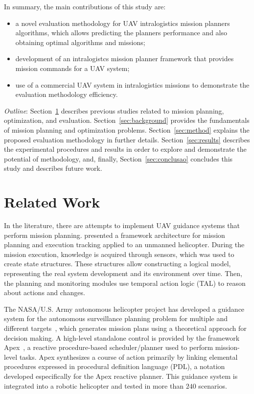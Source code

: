 \documentclass[conference,harvard,brazil,english]{sbatex}
\begin{document}
In summary, the main contributions of this study are:
\begin{itemize}
\item a novel evaluation methodology for UAV intralogistics mission planners algorithms, which allows predicting the planners performance and also obtaining optimal algorithms and missions;
\item development of an intralogistcs mission planner framework that provides mission commands for a UAV system; 
\item use of a commercial UAV system in intralogistics missions to demonstrate the evaluation methodology efficiency.
\end{itemize}

\textit{Outline}: Section~\ref{sec:related} describes previous studies related to mission planning, optimization, and evaluation. Section~\ref{sec:background} provides the fundamentals of mission planning and optimization problems. Section~\ref{sec:method} explains the proposed evaluation methodology in further details. Section~\ref{sec:results} describes the experimental procedures and results in order to explore and demonstrate the potential of methodology, and, finally, Section~\ref{sec:conclusao} concludes this study and describes future work.

\section{Related Work}
\label{sec:related}

In the literature, there are attempts to implement UAV guidance systems that perform mission planning.  presented a framework architecture for mission planning and execution tracking applied to an unmanned helicopter. During the mission execution, knowledge is acquired through sensors, which was used to create state structures. These structures allow constructing a logical model, representing the real system development and its environment over time. Then, the planning and monitoring modules use temporal action logic (TAL) to reason about actions and changes.

The NASA/U.S. Army autonomous helicopter project has developed a guidance system for the autonomous surveillance planning problem for multiple and different targets~\cite{whalley2005design}, which generates mission plans using a theoretical approach for decision making. A high-level standalone control is provided by the framework Apex~\cite{baer1998nasa}, a reactive procedure-based scheduler/planner used to perform mission-level tasks. Apex synthesizes a course of action primarily by linking elemental procedures expressed in procedural definition language (PDL), a notation developed especifically for the Apex reactive planner. This guidance system is integrated into a robotic helicopter and tested in more than $240$ scenarios.
\end{document}
